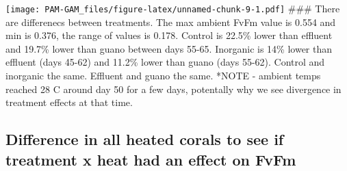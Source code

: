 \documentclass[
]{article}
\newenvironment{Shaded}{\begin{snugshade}}{\end{snugshade}}
\newcommand{\AttributeTok}[1]{\textcolor[rgb]{0.13,0.29,0.53}{#1}}
\newcommand{\CommentTok}[1]{\textcolor[rgb]{0.56,0.35,0.01}{\textit{#1}}}
\newcommand{\DecValTok}[1]{\textcolor[rgb]{0.00,0.00,0.81}{#1}}
\newcommand{\FunctionTok}[1]{\textcolor[rgb]{0.13,0.29,0.53}{\textbf{#1}}}
\newcommand{\NormalTok}[1]{#1}
\newcommand{\SpecialCharTok}[1]{\textcolor[rgb]{0.81,0.36,0.00}{\textbf{#1}}}
\begin{document}
\begin{Shaded}
\end{Shaded}

\texttt{[image: PAM-GAM\_files/figure-latex/unnamed-chunk-9-1.pdf]}
\#\#\# There are differenecs between treatments. The max ambient FvFm
value is 0.554 and min is 0.376, the range of values is 0.178. Control
is 22.5\% lower than effluent and 19.7\% lower than guano between days
55-65. Inorganic is 14\% lower than effluent (days 45-62) and 11.2\%
lower than guano (days 55-62). Control and inorganic the same. Effluent
and guano the same. *NOTE - ambient temps reached 28 C around day 50 for
a few days, potentally why we see divergence in treatment effects at
that time.

\hypertarget{difference-in-all-heated-corals-to-see-if-treatment-x-heat-had-an-effect-on-fvfm}{%
\subsection{Difference in all heated corals to see if treatment x heat
had an effect on
FvFm}\label{difference-in-all-heated-corals-to-see-if-treatment-x-heat-had-an-effect-on-fvfm}}
\end{document}
